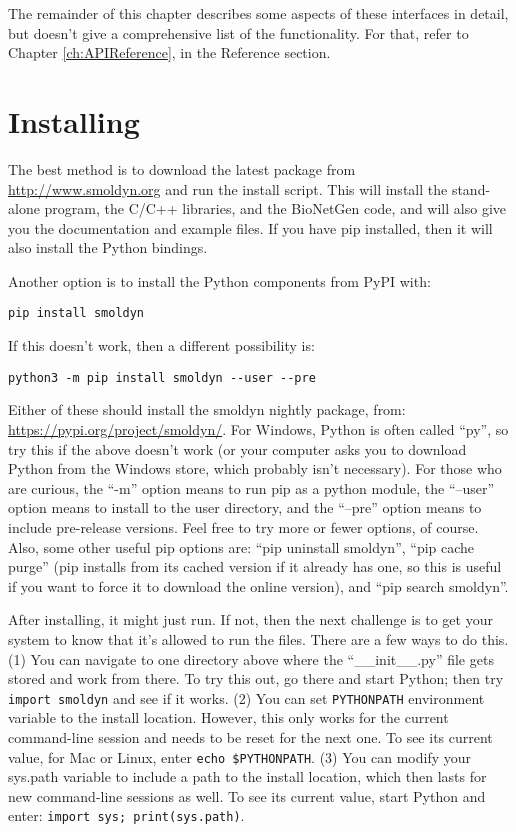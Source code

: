 \documentclass {scrbook}
\newcommand {\ttt} {\texttt}
\begin{document}
The remainder of this chapter describes some aspects of these interfaces in detail, but doesn't give a comprehensive list of the functionality. For that, refer to Chapter \ref{ch:APIReference}, in the Reference section.

\section{Installing}

The best method is to download the latest package from \url{http://www.smoldyn.org} and run the install script. This will install the stand-alone program, the C/C++ libraries, and the BioNetGen code, and will also give you the documentation and example files. If you have pip installed, then it will also install the Python bindings.

Another option is to install the Python components from PyPI with:
\begin{lstlisting}[style=SSAC]
pip install smoldyn
\end{lstlisting}
If this doesn't work, then a different possibility is:
\begin{lstlisting}[style=SSAC]
python3 -m pip install smoldyn --user --pre
\end{lstlisting}
Either of these should install the smoldyn nightly package, from: \url{https://pypi.org/project/smoldyn/}. For Windows, Python is often called ``py'', so try this if the above doesn't work (or your computer asks you to download Python from the Windows store, which probably isn't necessary). For those who are curious, the ``-m'' option means to run pip as a python module, the ``--user'' option means to install to the user directory, and the ``--pre'' option means to include pre-release versions. Feel free to try more or fewer options, of course. Also, some other useful pip options are: ``pip uninstall smoldyn'', ``pip cache purge'' (pip installs from its cached version if it already has one, so this is useful if you want to force it to download the online version), and ``pip search smoldyn''.

After installing, it might just run. If not, then the next challenge is to get your system to know that it's allowed to run the files. There are a few ways to do this. (1) You can navigate to one directory above where the ``\_\_init\_\_.py'' file gets stored and work from there. To try this out, go there and start Python; then try \ttt{import smoldyn} and see if it works. (2) You can set \ttt{PYTHONPATH} environment variable to the install location. However, this only works for the current command-line session and needs to be reset for the next one. To see its current value, for Mac or Linux, enter \ttt{echo \$PYTHONPATH}. (3) You can modify your sys.path variable to include a path to the install location, which then lasts for new command-line sessions as well. To see its current value, start Python and enter: \ttt{import sys; print(sys.path)}.
\end{document}

